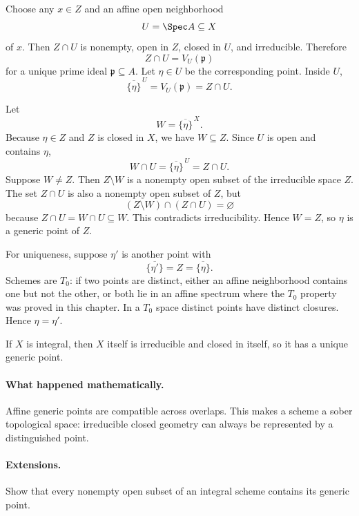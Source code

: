 \begin{solution}
Choose any $x\in Z$ and an affine open neighborhood
\[
U=\Spec A\subseteq X
\]
of $x$.  Then $Z\cap U$ is nonempty, open in $Z$, closed in $U$, and irreducible.
Therefore
\[
Z\cap U=V_U(\mathfrak p)
\]
for a unique prime ideal $\mathfrak p\subseteq A$.  Let $\eta\in U$ be the corresponding
point.  Inside $U$,
\[
\overline{\{\eta\}}^{\,U}=V_U(\mathfrak p)=Z\cap U.
\]

Let
\[
W=\overline{\{\eta\}}^{\,X}.
\]
Because $\eta\in Z$ and $Z$ is closed in $X$, we have $W\subseteq Z$.  Since $U$ is open
and contains $\eta$,
\[
W\cap U
=
\overline{\{\eta\}}^{\,U}
=
Z\cap U.
\]
Suppose $W\neq Z$.  Then $Z\setminus W$ is a nonempty open subset of the irreducible space
$Z$.  The set $Z\cap U$ is also a nonempty open subset of $Z$, but
\[
(Z\setminus W)\cap(Z\cap U)=\varnothing
\]
because $Z\cap U=W\cap U\subseteq W$.  This contradicts irreducibility.  Hence $W=Z$,
so $\eta$ is a generic point of $Z$.

For uniqueness, suppose $\eta'$ is another point with
\[
\overline{\{\eta'\}}=Z=\overline{\{\eta\}}.
\]
Schemes are $T_0$: if two points are distinct, either an affine neighborhood contains one
but not the other, or both lie in an affine spectrum where the $T_0$ property was proved
in this chapter.  In a $T_0$ space distinct points have distinct closures.  Hence
$\eta=\eta'$.

If $X$ is integral, then $X$ itself is irreducible and closed in itself, so it has a unique
generic point.
\end{solution}

\paragraph{What happened mathematically.}
Affine generic points are compatible across overlaps.  This makes a scheme a sober
topological space: irreducible closed geometry can always be represented by a distinguished
point.

\paragraph{Extensions.}
Show that every nonempty open subset of an integral scheme contains its generic point.
